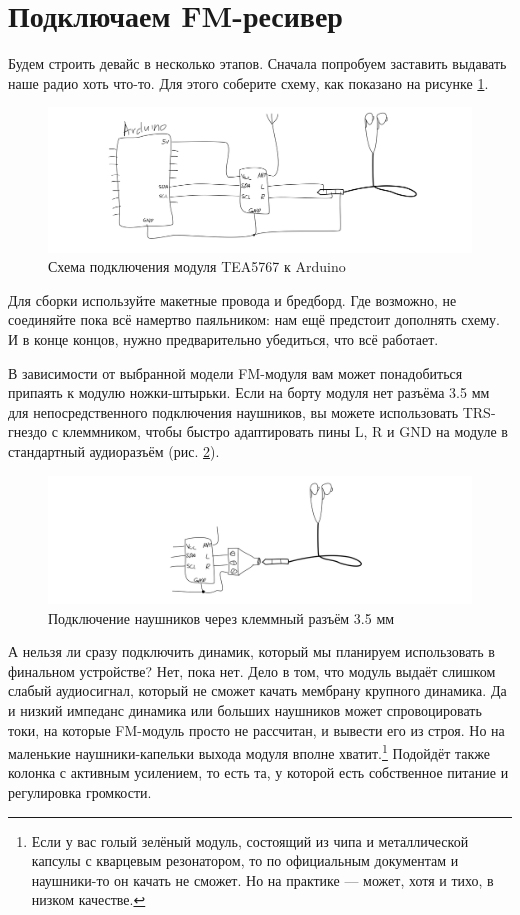 \section{Подключаем FM-ресивер}

Будем строить девайс в несколько этапов. Сначала попробуем заставить выдавать наше радио хоть что-то. Для этого соберите схему, как показано на рисунке \ref{fig:tea5767-wiring}.

\begin{figure}
  \centering
  \includegraphics{sketches/tea5767-wiring}
  \caption{Схема подключения модуля TEA5767 к Arduino}
  \label{fig:tea5767-wiring}
\end{figure}

Для сборки используйте макетные провода и бредборд. Где возможно, не соединяйте пока всё намертво паяльником: нам ещё предстоит дополнять схему. И в конце концов, нужно предварительно убедиться, что всё работает.

В зависимости от выбранной модели FM-модуля вам может понадобиться припаять к модулю ножки-штырьки. Если на борту модуля нет разъёма 3.5 мм для непосредственного подключения наушников, вы можете использовать TRS-гнездо с клеммником, чтобы быстро адаптировать пины L, R и GND на модуле в стандартный аудиоразъём (рис. \ref{fig:trs-35-mm}).

\begin{figure}
  \centering
  \includegraphics{sketches/trs-35-mm}
  \caption{Подключение наушников через клеммный разъём 3.5 мм}
  \label{fig:trs-35-mm}
\end{figure}

А нельзя ли сразу подключить динамик, который мы планируем использовать в финальном устройстве? Нет, пока нет. Дело в том, что модуль выдаёт слишком слабый аудиосигнал, который не сможет качать мембрану крупного динамика. Да и низкий импеданс динамика или больших наушников может спровоцировать токи, на которые FM-модуль просто не рассчитан, и вывести его из строя. Но на маленькие наушники-капельки выхода модуля вполне хватит.\footnote{Если у вас голый зелёный модуль, состоящий из чипа и металлической капсулы с кварцевым резонатором, то по официальным документам и наушники-то он качать не сможет. Но на практике — может, хотя и тихо, в низком качестве.} Подойдёт также колонка с активным усилением, то есть та, у которой есть собственное питание и регулировка громкости.

